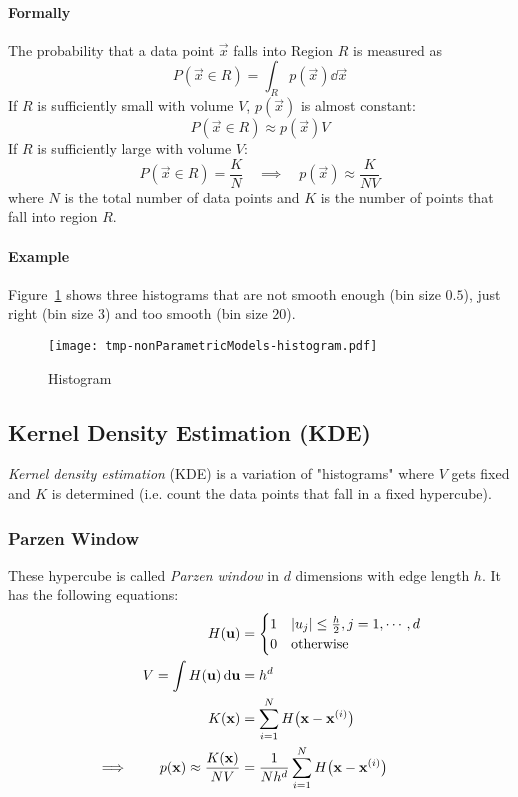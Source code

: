 			\paragraph{Formally}
				The probability that a data point \(\vec{x}\) falls into Region \(R\) is measured as
				\begin{equation}
					P(\vec{x} \in R) = \int_R p(\vec{x}) \dd{\vec{x}}
				\end{equation}
				If \(R\) is sufficiently small with volume \(V\), \(p(\vec{x})\) is almost constant:
				\begin{equation}
					P(\vec{x} \in R) \approx p(\vec{x}) V
				\end{equation}
				If \(R\) is sufficiently large with volume \(V\):
				\begin{equation}
					P(\vec{x} \in R) = \frac{K}{N} \quad\implies\quad p(\vec{x}) \approx \frac{K}{NV}
				\end{equation}
				where \(N\) is the total number of data points and \(K\) is the number of points that fall into region \(R\).

			\paragraph{Example}
				Figure~\ref{fig:histogram} shows three histograms that are not smooth enough (bin size \(0.5\)), just right (bin size \(3\)) and too smooth (bin size \(20\)).

				\begin{figure}
					\centering
					\texttt{[image: tmp-nonParametricModels-histogram.pdf]}
					\caption{Histogram}
					\label{fig:histogram}
				\end{figure}

		\subsection{Kernel Density Estimation (KDE)}
			\emph{Kernel density estimation} (KDE) is a variation of "histograms" where \(V\) gets fixed and \(K\) is determined (i.e. count the data points that fall in a fixed hypercube).

			\subsubsection{Parzen Window}
				These hypercube is called \emph{Parzen window} in \(d\) dimensions with edge length \(h\). It has the following equations:
				\begin{align}
					H(\boldsymbol{\mathrm{u}}) &=
						\begin{cases}
							1 & \abs{u_j} \leq \frac{h}{2}, j = 1, \cdots, d \\
							0 & \textrm{otherwise}
						\end{cases} \\
					V = \int H(\boldsymbol{\mathrm{u}}) \dd{\boldsymbol{\mathrm{u}}} &= h^d \\
					K(\boldsymbol{\mathrm{x}}) &= \sum_{i = 1}^{N} H\big(\boldsymbol{\mathrm{x}} - \boldsymbol{\mathrm{x}}^{(i)}\big) \\
					\implies\qquad p(\boldsymbol{\mathrm{x}}) \approx \frac{K(\boldsymbol{\mathrm{x}})}{NV} &= \frac{1}{Nh^d} \sum_{i = 1}^{N} H\big(\boldsymbol{\mathrm{x}} - \boldsymbol{\mathrm{x}}^{(i)}\big)
				\end{align}

